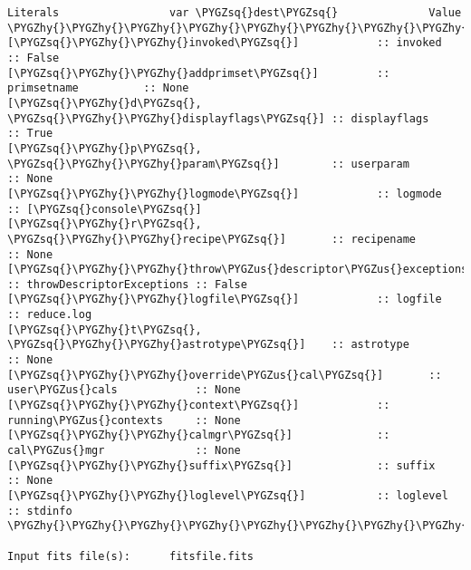 \documentclass[letterpaper,10pt,english]{sphinxmanual}
\def\PYGZus{\char`\_}
\def\PYGZhy{\char`\-}
\def\PYGZsq{\char`\'}
\begin{document}
\begin{description}
\begin{Verbatim}[commandchars=\\\{\}]
Literals                 var \PYGZsq{}dest\PYGZsq{}              Value
\PYGZhy{}\PYGZhy{}\PYGZhy{}\PYGZhy{}\PYGZhy{}\PYGZhy{}\PYGZhy{}\PYGZhy{}\PYGZhy{}\PYGZhy{}\PYGZhy{}\PYGZhy{}\PYGZhy{}\PYGZhy{}\PYGZhy{}\PYGZhy{}\PYGZhy{}\PYGZhy{}\PYGZhy{}\PYGZhy{}\PYGZhy{}\PYGZhy{}\PYGZhy{}\PYGZhy{}\PYGZhy{}\PYGZhy{}\PYGZhy{}\PYGZhy{}\PYGZhy{}\PYGZhy{}\PYGZhy{}\PYGZhy{}\PYGZhy{}\PYGZhy{}\PYGZhy{}\PYGZhy{}\PYGZhy{}\PYGZhy{}\PYGZhy{}\PYGZhy{}\PYGZhy{}\PYGZhy{}\PYGZhy{}\PYGZhy{}\PYGZhy{}\PYGZhy{}\PYGZhy{}\PYGZhy{}\PYGZhy{}\PYGZhy{}\PYGZhy{}\PYGZhy{}\PYGZhy{}\PYGZhy{}\PYGZhy{}\PYGZhy{}\PYGZhy{}\PYGZhy{}\PYGZhy{}\PYGZhy{}\PYGZhy{}\PYGZhy{}\PYGZhy{}\PYGZhy{}\PYGZhy{}
[\PYGZsq{}\PYGZhy{}\PYGZhy{}invoked\PYGZsq{}]            :: invoked              :: False
[\PYGZsq{}\PYGZhy{}\PYGZhy{}addprimset\PYGZsq{}]         :: primsetname          :: None
[\PYGZsq{}\PYGZhy{}d\PYGZsq{}, \PYGZsq{}\PYGZhy{}\PYGZhy{}displayflags\PYGZsq{}] :: displayflags         :: True
[\PYGZsq{}\PYGZhy{}p\PYGZsq{}, \PYGZsq{}\PYGZhy{}\PYGZhy{}param\PYGZsq{}]        :: userparam            :: None
[\PYGZsq{}\PYGZhy{}\PYGZhy{}logmode\PYGZsq{}]            :: logmode              :: [\PYGZsq{}console\PYGZsq{}]
[\PYGZsq{}\PYGZhy{}r\PYGZsq{}, \PYGZsq{}\PYGZhy{}\PYGZhy{}recipe\PYGZsq{}]       :: recipename           :: None
[\PYGZsq{}\PYGZhy{}\PYGZhy{}throw\PYGZus{}descriptor\PYGZus{}exceptions\PYGZsq{}] :: throwDescriptorExceptions :: False
[\PYGZsq{}\PYGZhy{}\PYGZhy{}logfile\PYGZsq{}]            :: logfile              :: reduce.log
[\PYGZsq{}\PYGZhy{}t\PYGZsq{}, \PYGZsq{}\PYGZhy{}\PYGZhy{}astrotype\PYGZsq{}]    :: astrotype            :: None
[\PYGZsq{}\PYGZhy{}\PYGZhy{}override\PYGZus{}cal\PYGZsq{}]       :: user\PYGZus{}cals            :: None
[\PYGZsq{}\PYGZhy{}\PYGZhy{}context\PYGZsq{}]            :: running\PYGZus{}contexts     :: None
[\PYGZsq{}\PYGZhy{}\PYGZhy{}calmgr\PYGZsq{}]             :: cal\PYGZus{}mgr              :: None
[\PYGZsq{}\PYGZhy{}\PYGZhy{}suffix\PYGZsq{}]             :: suffix               :: None
[\PYGZsq{}\PYGZhy{}\PYGZhy{}loglevel\PYGZsq{}]           :: loglevel             :: stdinfo
\PYGZhy{}\PYGZhy{}\PYGZhy{}\PYGZhy{}\PYGZhy{}\PYGZhy{}\PYGZhy{}\PYGZhy{}\PYGZhy{}\PYGZhy{}\PYGZhy{}\PYGZhy{}\PYGZhy{}\PYGZhy{}\PYGZhy{}\PYGZhy{}\PYGZhy{}\PYGZhy{}\PYGZhy{}\PYGZhy{}\PYGZhy{}\PYGZhy{}\PYGZhy{}\PYGZhy{}\PYGZhy{}\PYGZhy{}\PYGZhy{}\PYGZhy{}\PYGZhy{}\PYGZhy{}\PYGZhy{}\PYGZhy{}\PYGZhy{}\PYGZhy{}\PYGZhy{}\PYGZhy{}\PYGZhy{}\PYGZhy{}\PYGZhy{}\PYGZhy{}\PYGZhy{}\PYGZhy{}\PYGZhy{}\PYGZhy{}\PYGZhy{}\PYGZhy{}\PYGZhy{}\PYGZhy{}\PYGZhy{}\PYGZhy{}\PYGZhy{}\PYGZhy{}\PYGZhy{}\PYGZhy{}\PYGZhy{}\PYGZhy{}\PYGZhy{}\PYGZhy{}\PYGZhy{}\PYGZhy{}\PYGZhy{}\PYGZhy{}\PYGZhy{}\PYGZhy{}\PYGZhy{}

Input fits file(s):      fitsfile.fits
\end{Verbatim}

\end{description}
\end{document}
